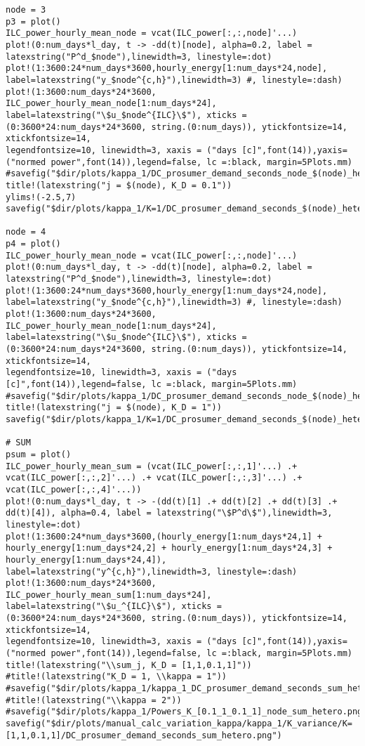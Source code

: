 \begin{lstlisting}
node = 3
p3 = plot()
ILC_power_hourly_mean_node = vcat(ILC_power[:,:,node]'...)
plot!(0:num_days*l_day, t -> -dd(t)[node], alpha=0.2, label = latexstring("P^d_$node"),linewidth=3, linestyle=:dot)
plot!(1:3600:24*num_days*3600,hourly_energy[1:num_days*24,node], label=latexstring("y_$node^{c,h}"),linewidth=3) #, linestyle=:dash)
plot!(1:3600:num_days*24*3600,  ILC_power_hourly_mean_node[1:num_days*24], label=latexstring("\$u_$node^{ILC}\$"), xticks = (0:3600*24:num_days*24*3600, string.(0:num_days)), ytickfontsize=14,
xtickfontsize=14,
legendfontsize=10, linewidth=3, xaxis = ("days [c]",font(14)),yaxis=("normed power",font(14)),legend=false, lc =:black, margin=5Plots.mm)
#savefig("$dir/plots/kappa_1/DC_prosumer_demand_seconds_node_$(node)_hetero.png")
title!(latexstring("j = $(node), K_D = 0.1"))
ylims!(-2.5,7)
savefig("$dir/plots/kappa_1/K=1/DC_prosumer_demand_seconds_$(node)_hetero.png")

node = 4
p4 = plot()
ILC_power_hourly_mean_node = vcat(ILC_power[:,:,node]'...)
plot!(0:num_days*l_day, t -> -dd(t)[node], alpha=0.2, label = latexstring("P^d_$node"),linewidth=3, linestyle=:dot)
plot!(1:3600:24*num_days*3600,hourly_energy[1:num_days*24,node], label=latexstring("y_$node^{c,h}"),linewidth=3) #, linestyle=:dash)
plot!(1:3600:num_days*24*3600,  ILC_power_hourly_mean_node[1:num_days*24], label=latexstring("\$u_$node^{ILC}\$"), xticks = (0:3600*24:num_days*24*3600, string.(0:num_days)), ytickfontsize=14,
xtickfontsize=14,
legendfontsize=10, linewidth=3, xaxis = ("days [c]",font(14)),legend=false, lc =:black, margin=5Plots.mm)
#savefig("$dir/plots/kappa_1/DC_prosumer_demand_seconds_node_$(node)_hetero.png")
title!(latexstring("j = $(node), K_D = 1"))
savefig("$dir/plots/kappa_1/K=1/DC_prosumer_demand_seconds_$(node)_hetero.png")

# SUM
psum = plot()
ILC_power_hourly_mean_sum = (vcat(ILC_power[:,:,1]'...) .+ vcat(ILC_power[:,:,2]'...) .+ vcat(ILC_power[:,:,3]'...) .+ vcat(ILC_power[:,:,4]'...))
plot!(0:num_days*l_day, t -> -(dd(t)[1] .+ dd(t)[2] .+ dd(t)[3] .+ dd(t)[4]), alpha=0.4, label = latexstring("\$P^d\$"),linewidth=3, linestyle=:dot)
plot!(1:3600:24*num_days*3600,(hourly_energy[1:num_days*24,1] + hourly_energy[1:num_days*24,2] + hourly_energy[1:num_days*24,3] + hourly_energy[1:num_days*24,4]), label=latexstring("y^{c,h}"),linewidth=3, linestyle=:dash)
plot!(1:3600:num_days*24*3600,  ILC_power_hourly_mean_sum[1:num_days*24], label=latexstring("\$u_^{ILC}\$"), xticks = (0:3600*24:num_days*24*3600, string.(0:num_days)), ytickfontsize=14,
xtickfontsize=14,
legendfontsize=10, linewidth=3, xaxis = ("days [c]",font(14)),yaxis=("normed power",font(14)),legend=false, lc =:black, margin=5Plots.mm)
title!(latexstring("\\sum_j, K_D = [1,1,0.1,1]"))
#title!(latexstring("K_D = 1, \\kappa = 1"))
#savefig("$dir/plots/kappa_1/kappa_1_DC_prosumer_demand_seconds_sum_hetero.png")
#title!(latexstring("\\kappa = 2"))
#savefig("$dir/plots/kappa_1/Powers_K_[0.1_1_0.1_1]_node_sum_hetero.png")
savefig("$dir/plots/manual_calc_variation_kappa/kappa_1/K_variance/K=[1,1,0.1,1]/DC_prosumer_demand_seconds_sum_hetero.png")


\end{lstlisting}
